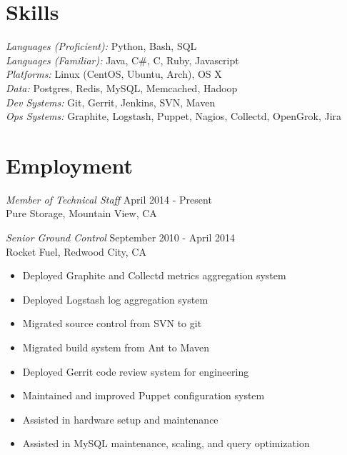 \documentclass[line,margin]{res}
\begin{document}
\address{\sl resume@corryh.com}
\address{\sl github.com/tabletcorry}

\begin{resume}
 
\section{Skills} {\sl Languages (Proficient):} Python, Bash, SQL\\
                {\sl Languages (Familiar):} Java, C\#, C, Ruby, Javascript\\
                {\sl Platforms:} Linux (CentOS, Ubuntu, Arch), OS X\\
                {\sl Data:} Postgres, Redis, MySQL, Memcached, Hadoop\\
                {\sl Dev Systems:} Git, Gerrit, Jenkins, SVN, Maven\\
                {\sl Ops Systems:} Graphite, Logstash, Puppet, Nagios, Collectd, OpenGrok, Jira
 
\section{Employment} 
		{\sl Member of Technical Staff} \hfill April 2014 - Present \\
                Pure Storage, Mountain View, CA
                
                {\sl Senior Ground Control} \hfill September 2010 - April 2014 \\
                Rocket Fuel, Redwood City, CA
                \begin{itemize}  \itemsep -2pt
                 \item Deployed Graphite and Collectd metrics aggregation system
                 \item Deployed Logstash log aggregation system
                 \item Migrated source control from SVN to git
                 \item Migrated build system from Ant to Maven
                 \item Deployed Gerrit code review system for engineering
                 \item Maintained and improved Puppet configuration system
                 \item Assisted in hardware setup and maintenance
                 \item Assisted in MySQL maintenance, scaling, and query optimization
                \end{itemize}


\end{resume}
\end{document}
